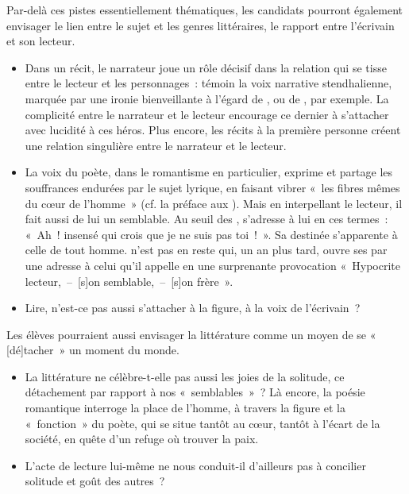 {Par-delà ces pistes essentiellement thématiques, les candidats pourront également
envisager le lien entre le sujet et les genres littéraires, le rapport entre l'écrivain et son
lecteur.

\begin{itemize}
\item Dans un récit, le narrateur joue un rôle décisif dans la relation qui se tisse entre le
lecteur et les personnages~: témoin la voix narrative stendhalienne, marquée par une
ironie bienveillante à l'égard de , ou de , par exemple.
La complicité entre le narrateur et le lecteur encourage ce dernier à s'attacher avec
lucidité à ces héros. Plus encore, les récits à la première personne créent une relation
singulière entre le narrateur et le lecteur.
\item La voix du poète, dans le romantisme en particulier, exprime et partage les
souffrances endurées par le sujet lyrique, en faisant vibrer «~les fibres mêmes du cœur
de l'homme~» (cf. la préface aux ). Mais en interpellant le lecteur,
il fait aussi de lui un semblable. Au seuil des ,  s'adresse à lui en
ces termes~: «~Ah~! insensé qui crois que je ne suis pas toi~!~». Sa destinée s'apparente
à celle de tout homme.  n'est pas en reste qui, un an plus tard, ouvre ses
 par une adresse à celui qu'il appelle en une surprenante provocation «~Hypocrite lecteur,~--~[s]on semblable,~--~[s]on frère~».
\item Lire, n'est-ce pas aussi s'attacher à la figure, à la voix de l'écrivain~?
\end{itemize}

Les élèves pourraient aussi envisager la littérature comme un moyen de se «
[dé]tacher~» un moment du monde.

\begin{itemize}
\item La littérature ne célèbre-t-elle pas aussi les joies de la solitude, ce détachement par
rapport à nos «~semblables~»~? Là encore, la poésie romantique interroge la place de
l'homme, à travers la figure et la «~fonction~» du poète, qui se situe tantôt au cœur,
tantôt à l'écart de la société, en quête d'un refuge où trouver la paix.
\item L'acte de lecture lui-même ne nous conduit-il d'ailleurs pas à concilier solitude et goût
des autres~?
\end{itemize}}


